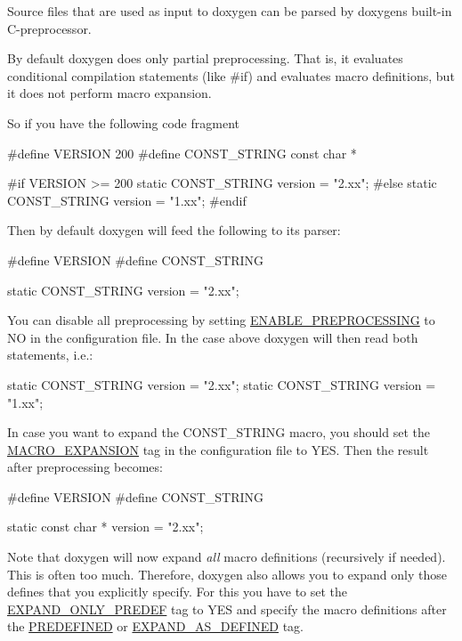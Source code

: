 Source files that are used as input to doxygen can be parsed by doxygen\textquotesingle{}s built-\/in C-\/preprocessor.

By default doxygen does only partial preprocessing. That is, it evaluates conditional compilation statements (like {\ttfamily \#if}) and evaluates macro definitions, but it does not perform macro expansion.

So if you have the following code fragment \begin{DoxyVerb}#define VERSION 200
#define CONST_STRING const char *

#if VERSION >= 200
  static CONST_STRING version = "2.xx";
#else
  static CONST_STRING version = "1.xx";
#endif
\end{DoxyVerb}


Then by default doxygen will feed the following to its parser\+:

\begin{DoxyVerb}#define VERSION
#define CONST_STRING

  static CONST_STRING version = "2.xx";
\end{DoxyVerb}


You can disable all preprocessing by setting \mbox{\hyperlink{config_cfg_enable_preprocessing}{E\+N\+A\+B\+L\+E\+\_\+\+P\+R\+E\+P\+R\+O\+C\+E\+S\+S\+I\+NG}} to {\ttfamily NO} in the configuration file. In the case above doxygen will then read both statements, i.\+e.\+:

\begin{DoxyVerb}  static CONST_STRING version = "2.xx";
  static CONST_STRING version = "1.xx";
\end{DoxyVerb}


In case you want to expand the {\ttfamily C\+O\+N\+S\+T\+\_\+\+S\+T\+R\+I\+NG} macro, you should set the \mbox{\hyperlink{config_cfg_macro_expansion}{M\+A\+C\+R\+O\+\_\+\+E\+X\+P\+A\+N\+S\+I\+ON}} tag in the configuration file to {\ttfamily Y\+ES}. Then the result after preprocessing becomes\+:

\begin{DoxyVerb}#define VERSION
#define CONST_STRING

  static const char * version = "2.xx";
\end{DoxyVerb}


Note that doxygen will now expand {\itshape all} macro definitions (recursively if needed). This is often too much. Therefore, doxygen also allows you to expand only those defines that you explicitly specify. For this you have to set the \mbox{\hyperlink{config_cfg_expand_only_predef}{E\+X\+P\+A\+N\+D\+\_\+\+O\+N\+L\+Y\+\_\+\+P\+R\+E\+D\+EF}} tag to {\ttfamily Y\+ES} and specify the macro definitions after the \mbox{\hyperlink{config_cfg_predefined}{P\+R\+E\+D\+E\+F\+I\+N\+ED}} or \mbox{\hyperlink{config_cfg_expand_as_defined}{E\+X\+P\+A\+N\+D\+\_\+\+A\+S\+\_\+\+D\+E\+F\+I\+N\+ED}} tag. ~\newline


